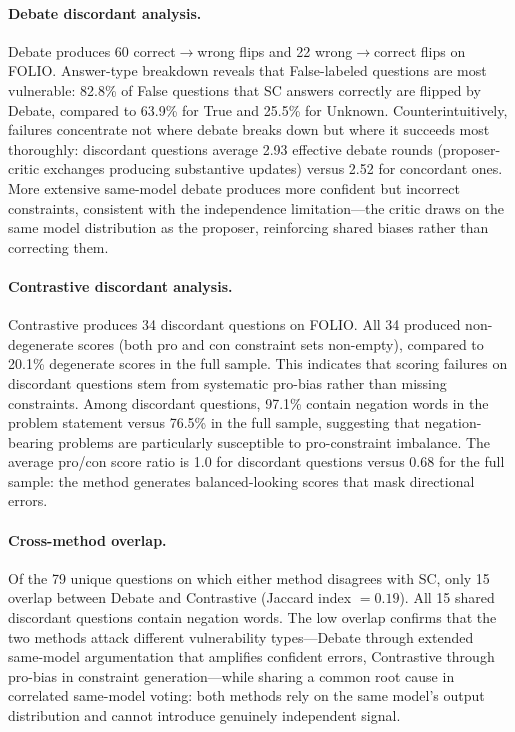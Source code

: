 \paragraph{Debate discordant analysis.} Debate produces 60 correct$\to$wrong flips and 22 wrong$\to$correct flips on FOLIO. Answer-type breakdown reveals that False-labeled questions are most vulnerable: 82.8\% of False questions that SC answers correctly are flipped by Debate, compared to 63.9\% for True and 25.5\% for Unknown. Counterintuitively, failures concentrate not where debate breaks down but where it succeeds most thoroughly: discordant questions average 2.93 effective debate rounds (proposer-critic exchanges producing substantive updates) versus 2.52 for concordant ones. More extensive same-model debate produces more confident but incorrect constraints, consistent with the independence limitation---the critic draws on the same model distribution as the proposer, reinforcing shared biases rather than correcting them.

\paragraph{Contrastive discordant analysis.} Contrastive produces 34 discordant questions on FOLIO. All 34 produced non-degenerate scores (both pro and con constraint sets non-empty), compared to 20.1\% degenerate scores in the full sample. This indicates that scoring failures on discordant questions stem from systematic pro-bias rather than missing constraints. Among discordant questions, 97.1\% contain negation words in the problem statement versus 76.5\% in the full sample, suggesting that negation-bearing problems are particularly susceptible to pro-constraint imbalance. The average pro/con score ratio is 1.0 for discordant questions versus 0.68 for the full sample: the method generates balanced-looking scores that mask directional errors.

\paragraph{Cross-method overlap.} Of the 79 unique questions on which either method disagrees with SC, only 15 overlap between Debate and Contrastive (Jaccard index $= 0.19$). All 15 shared discordant questions contain negation words. The low overlap confirms that the two methods attack different vulnerability types---Debate through extended same-model argumentation that amplifies confident errors, Contrastive through pro-bias in constraint generation---while sharing a common root cause in correlated same-model voting: both methods rely on the same model's output distribution and cannot introduce genuinely independent signal.


